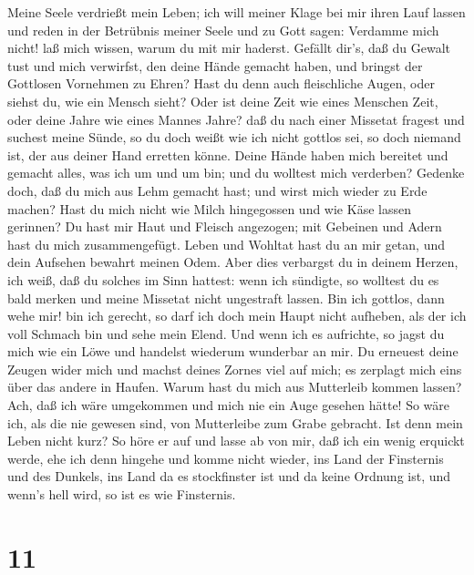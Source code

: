  Meine Seele verdrießt mein Leben; ich will meiner Klage bei
mir ihren Lauf lassen und reden in der Betrübnis meiner Seele
 und zu Gott sagen: Verdamme mich nicht! laß mich wissen,
warum du mit mir haderst.  Gefällt dir's, daß du Gewalt tust
und mich verwirfst, den deine Hände gemacht haben, und bringst der
Gottlosen Vornehmen zu Ehren?  Hast du denn auch
fleischliche Augen, oder siehst du, wie ein Mensch sieht? 
Oder ist deine Zeit wie eines Menschen Zeit, oder deine Jahre wie eines
Mannes Jahre?  daß du nach einer Missetat fragest und
suchest meine Sünde,  so du doch weißt wie ich nicht gottlos
sei, so doch niemand ist, der aus deiner Hand erretten könne.
 Deine Hände haben mich bereitet und gemacht alles, was ich
um und um bin; und du wolltest mich verderben?  Gedenke
doch, daß du mich aus Lehm gemacht hast; und wirst mich wieder zu Erde
machen?  Hast du mich nicht wie Milch hingegossen und wie
Käse lassen gerinnen?  Du hast mir Haut und Fleisch
angezogen; mit Gebeinen und Adern hast du mich zusammengefügt.
 Leben und Wohltat hast du an mir getan, und dein Aufsehen
bewahrt meinen Odem.  Aber dies verbargst du in deinem
Herzen, ich weiß, daß du solches im Sinn hattest:  wenn ich
sündigte, so wolltest du es bald merken und meine Missetat nicht
ungestraft lassen.  Bin ich gottlos, dann wehe mir! bin ich
gerecht, so darf ich doch mein Haupt nicht aufheben, als der ich voll
Schmach bin und sehe mein Elend.  Und wenn ich es
aufrichte, so jagst du mich wie ein Löwe und handelst wiederum wunderbar
an mir.  Du erneuest deine Zeugen wider mich und machst
deines Zornes viel auf mich; es zerplagt mich eins über das andere in
Haufen.  Warum hast du mich aus Mutterleib kommen lassen?
Ach, daß ich wäre umgekommen und mich nie ein Auge gesehen hätte!
 So wäre ich, als die nie gewesen sind, von Mutterleibe zum
Grabe gebracht.  Ist denn mein Leben nicht kurz? So höre er
auf und lasse ab von mir, daß ich ein wenig erquickt werde,
 ehe ich denn hingehe und komme nicht wieder, ins Land der
Finsternis und des Dunkels,  ins Land da es stockfinster
ist und da keine Ordnung ist, und wenn's hell wird, so ist es wie
Finsternis.

\hypertarget{section-10}{%
\section{11}\label{section-10}}


